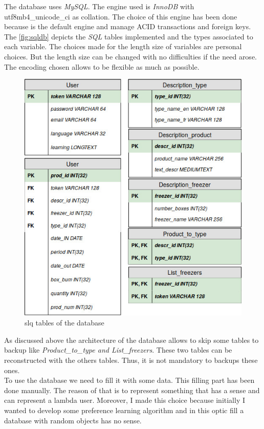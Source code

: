 The database uses \textit{MySQL}. The engine used is \textit{InnoDB} with utf8mb4\_unicode\_ci as collation. The choice of this engine has been done because is the default engine and manage ACID transactions and foreign keys. The \autoref{fig:sqldb} depicts the \textit{SQL} tables implemented and the types associated to each variable. The choices made for the length size of variables are personal choices. But the length size can be changed with no difficulties if the need arose. The encoding chosen allows to be flexible as much as possible.

\begin{figure}[H]
\centering
\includegraphics[scale=0.5]{./images/sqldb.jpg}
\caption{slq tables of the database}
\label{fig:sqldb}
\end{figure}

As discussed above the architecture of the database allows to skip some tables to backup like \textit{Product\_to\_type and List\_freezers}. These two tables can be reconstructed with the others tables. Thus, it is not mandatory to backups these ones.\\

To use the database we need to fill it with some data. This filling part has been done manually. The reason of that is to represent something that has a sense and can represent a lambda user. Moreover, I made this choice because initially I wanted to develop some preference learning algorithm and in this optic fill a database with random objects has no sense. 

